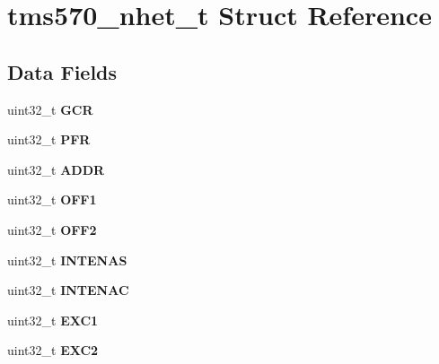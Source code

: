 \hypertarget{structtms570__nhet__t}{}\section{tms570\+\_\+nhet\+\_\+t Struct Reference}
\label{structtms570__nhet__t}
\subsection*{Data Fields}
\begin{DoxyCompactItemize}
\item 
\mbox{\label{structtms570__nhet__t_a94c5a324ea2b06e091de2af9b63bf683}} 
uint32\+\_\+t {\bfseries G\+CR}
\item 
\mbox{\label{structtms570__nhet__t_acf39513a0618316c285177477836dbda}} 
uint32\+\_\+t {\bfseries P\+FR}
\item 
\mbox{\label{structtms570__nhet__t_aba6d7e247be64e52127785343945d5a9}} 
uint32\+\_\+t {\bfseries A\+D\+DR}
\item 
\mbox{\label{structtms570__nhet__t_a8db0eaa855e1a447b2611734da5b4f0a}} 
uint32\+\_\+t {\bfseries O\+F\+F1}
\item 
\mbox{\label{structtms570__nhet__t_a2ff41614472907821e4cf8ed7494730c}} 
uint32\+\_\+t {\bfseries O\+F\+F2}
\item 
\mbox{\label{structtms570__nhet__t_a6dcfa8fb06a17170c836ff53acd91878}} 
uint32\+\_\+t {\bfseries I\+N\+T\+E\+N\+AS}
\item 
\mbox{\label{structtms570__nhet__t_ab788647584fbf5776e155649b9be8087}} 
uint32\+\_\+t {\bfseries I\+N\+T\+E\+N\+AC}
\item 
\mbox{\label{structtms570__nhet__t_ace26125a5cb5e5b727fa83585ffbcac5}} 
uint32\+\_\+t {\bfseries E\+X\+C1}
\item 
\mbox{\label{structtms570__nhet__t_adc301f176e3e5eb7306f742e3de38721}} 
uint32\+\_\+t {\bfseries E\+X\+C2}
\item 

\end{DoxyCompactItemize}
